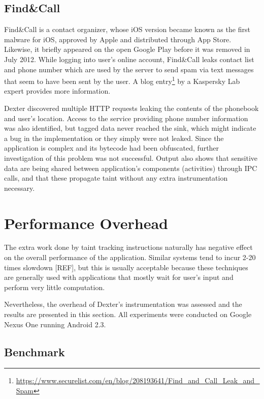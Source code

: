 \documentclass[12pt,twoside,notitlepage]{report}
\begin{document}
\subsection{Find\&Call}

Find\&Call is a contact organizer, whose iOS version became known as the first malware for iOS, approved by Apple and distributed through App Store. Likewise, it briefly appeared on the open Google Play before it was removed in July 2012. While logging into user's online account, Find\&Call leaks contact list and phone number which are used by the server to send spam via text messages that seem to have been sent by the user. A blog entry\footnote{\scriptsize\url{https://www.securelist.com/en/blog/208193641/Find_and_Call_Leak_and_Spam}} by a Kaspersky Lab expert provides more information.

Dexter discovered multiple HTTP requests leaking the contents of the phonebook and user's location. Access to the service providing phone number information was also identified, but tagged data never reached the sink, which might indicate a bug in the implementation or they simply were not leaked. Since the application is complex and its bytecode had been obfuscated, further investigation of this problem was not successful. Output also shows that sensitive data are being shared between application's components (activities) through IPC calls, and that these propagate taint without any extra instrumentation necessary.

\section{Performance Overhead}

The extra work done by taint tracking instructions naturally has negative effect on the overall performance of the application. Similar systems tend to incur 2-20 times slowdown {[}REF], but this is usually acceptable because these techniques are generally used with applications that mostly wait for user's input and perform very little computation. 

Nevertheless, the overhead of Dexter's instrumentation was assessed and the results are presented in this section. All experiments were conducted on Google Nexus One running Android 2.3. 

\subsection{Benchmark}
\end{document}
